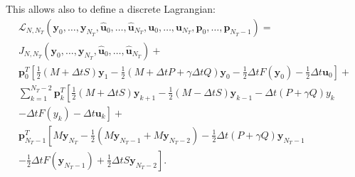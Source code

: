 This allows also to define a discrete Lagrangian:
 \begin{multline}
 \mathcal{L}_{N,N_{T}}(\mathbf{y}_{0}, \ldots, \mathbf{y}_{N_{T}}, \mathbf{\hat u}_{0}, \ldots, \mathbf{\hat u}_{N_{T}}, \mathbf{u}_{0}, \ldots, \mathbf{ u}_{N_{T}}, \mathbf{p}_{0}, \ldots, \mathbf{p}_{N_{T}-1}) = \\
 J_{N,N_{T}}(\mathbf{y}_{0}, \ldots, \mathbf{y}_{N_{T}}, \mathbf{\hat u}_{0}, \ldots, \mathbf{\hat u}_{N_{T}})  +\\
   \mathbf{p}_0^T\left[ \frac{1}{2}\left( M+\Delta t S\right) \mathbf{y}_1 - \frac{1}{2}\left( M + \Delta t P + \gamma \Delta t Q \right) \mathbf{y}_0 - \frac{1}{2}\Delta t F(\mathbf{y}_0) - \frac{1}{2}\Delta t \mathbf{u}_0 \right]+\\
  \sum_{k=1}^{N_T-2}{\mathbf{p}_k^T\left[\frac{1}{2}\left( M+\Delta t S\right) \mathbf{y}_{k+1} - \frac{1}{2}\left( M - \Delta t S\right) \mathbf{y}_{k-1} - \Delta t \left( P + \gamma Q\right)y_k \right.}\\
  \left.- \Delta t F(y_k) - \Delta t \mathbf{u}_k\right] + \\
 \mathbf{p}_{N_T-1}^T\left[ M \mathbf{y}_{N_T} - \frac{1}{2}\left( M \mathbf{y}_{N_T-1} + M \mathbf{y}_{N_T-2} \right)- \frac{1}{2}\Delta t \left(P+ \gamma Q\right) \mathbf{y}_{N_T - 1} \right.\\ \left.- \frac{1}{2}\Delta t F(\mathbf{y}_{N_T-1}) +\frac{1}{2}\Delta t S \mathbf{y}_{N_T-2}\right].
  \label{discrlag}
 \end{multline}

